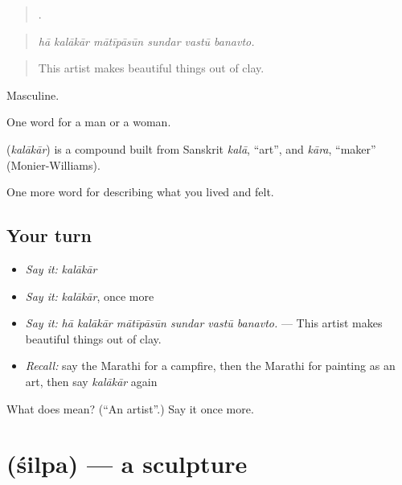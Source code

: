 \begin{quote}
     .
\end{quote}

\begin{quote}
\emph{hā kalākār mātīpāsūn sundar vastū banavto.}
\end{quote}

\begin{quote}
This artist makes beautiful things out of clay.
\end{quote}

Masculine.

One word for a man or a woman.

\begin{cousinweb}
\textbf{} (\emph{kalākār}) is a compound built from Sanskrit \emph{kalā}, \textquotedblleft{}art\textquotedblright{}, and \emph{kāra}, \textquotedblleft{}maker\textquotedblright{} (Monier-Williams).
\end{cousinweb}

\begin{grammarlens}[title={What you've built}]
One more word for describing what you lived and felt.
\end{grammarlens}

\subsection*{Your turn}
\begin{itemize}
\raggedright
  \item \emph{Say it:} \emph{kalākār}
  \item \emph{Say it:} \emph{kalākār}, once more
  \item \emph{Say it:} \emph{hā kalākār mātīpāsūn sundar vastū banavto.} — This artist makes beautiful things out of clay.
  \item \emph{Recall:} say the Marathi for a campfire, then the Marathi for painting as an art, then say \emph{kalākār} again
\end{itemize}

\begin{tcolorbox}[breakable,colback=teal!4,colframe=teal!35!black,title={Before you move on}]
What does  mean? (\textquotedblleft{}An artist\textquotedblright{}.) Say it once more.
\end{tcolorbox}
\section[\texorpdfstring{\mr{शिल्प} (śilpa)}{शिल्प (śilpa)}]{ (śilpa) — a sculpture}

